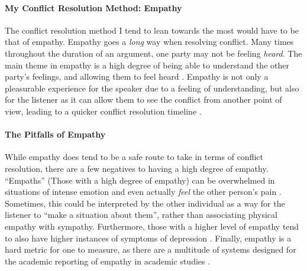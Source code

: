 \documentclass[stu,12pt]{apa7}
\begin{document}
      \paragraph{My Conflict Resolution Method: Empathy}
        The conflict resolution method I tend to lean towards the most would
          have to be that of empathy. Empathy goes a \textit{long} way when
          resolving conflict. Many times throughout the duration of an argument,
          one party may not be feeling \emph{heard}. The main theme in empathy
          is a high degree of being able to understand the other party's
          feelings, and allowing them to feel heard
          \parencite[pp. 48]{wied_empathy_2007}. Empathy is not only a
          pleasurable experience for the speaker due to a feeling of
          understanding, but also for the listener as it can allow them to see
          the conflict from another point of view, leading to a quicker conflict
          resolution timeline \parencite[pp. 49]{wied_empathy_2007}.

      \paragraph{The Pitfalls of Empathy}
        While empathy does tend to be a safe route to take in terms of conflict
          resolution, there are a few negatives to having a high degree of
          empathy. ``Empaths'' (Those with a high degree of empathy) can be
          overwhelmed in situations of intense emotion and even actually
          \textit{feel} the other person's pain
          \parencite[pp. 376]{schieman_when_2001}. Sometimes, this could be
          interpreted by the other individual as a way for the listener to
          ``make a situation about them'', rather than associating physical
          empathy with sympathy. Furthermore, those with a higher level of
          empathy tend to also have higher instances of symptoms of depression
          \parencite[pp. 376]{schieman_when_2001}. Finally, empathy is a hard
          metric for one to measure, as there are a multitude of systems
          designed for the academic reporting of empathy in academic studies
          \parencite[pp. 675]{zaki_neuroscience_2012}.


  
  

  \newpage
  \printbibliography[%
    title={References},%
    heading={bibintoc},%
    notcategory={consulted}%
  ]

  \newpage
  \nocite{*}
  \printbibliography[%
    title={Additional References},%
    heading={bibintoc},%
    category={consulted}%
  ]
\end{document}
